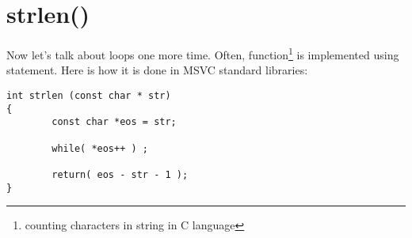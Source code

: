 \chapter{strlen()}

{Now let's talk about loops one more time. Often,  
function\footnote{counting characters in string in C language} is implemented using  
statement.}
{Here is how it is done in MSVC standard libraries:}

\begin{lstlisting}
int strlen (const char * str)
{
        const char *eos = str;

        while( *eos++ ) ;

        return( eos - str - 1 );
}
\end{lstlisting}



